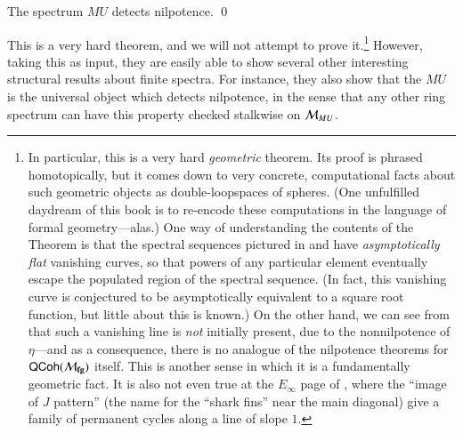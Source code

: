 \begin{theorem}\label{DevinatzHopkinsSmith}
The spectrum $MU$ detects nilpotence. \qed
\end{theorem}

\noindent This is a very hard theorem, and we will not attempt to prove it.\footnote{In particular, this is a very hard \emph{geometric} theorem.  Its proof is phrased homotopically, but it comes down to very concrete, computational facts about such geometric objects as double-loopspaces of spheres.  (One unfulfilled daydream of this book is to re-encode these computations in the language of formal geometry---alas.)  One way of understanding the contents of the Theorem is that the spectral sequences pictured in  and  have \emph{asymptotically flat} vanishing curves, so that powers of any particular element eventually escape the populated region of the spectral sequence.  (In fact, this vanishing curve is conjectured to be asymptotically equivalent to a square root function, but little about this is known.)  On the other hand, we can see from  that such a vanishing line is \emph{not} initially present, due to the nonnilpotence of $\eta$---and as a consequence, there is no analogue of the nilpotence theorems for $\mathsf{QCoh}(\mathcal{M}_{\mathbf{fg}})$ itself.  This is another sense in which it is a fundamentally geometric fact.  It is also not even true at the $E_\infty$ page of , where the ``image of $J$ pattern'' (the name for the ``shark fins'' near the main diagonal) give a family of permanent cycles along a line of slope $1$.}
However, taking this as input, they are easily able to show several other interesting structural results about finite spectra.  For instance, they also show that the $MU$ is the universal object which detects nilpotence, in the sense that any other ring spectrum can have this property checked stalkwise on $\mathcal{M}_{MU}$.


